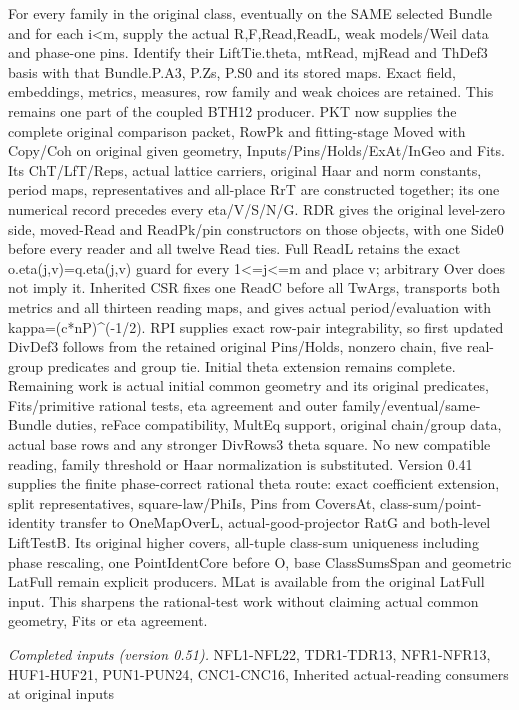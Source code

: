 For every family in the original class, eventually on the SAME selected Bundle and for each i<m, supply the actual R,F,Read,ReadL, weak models/Weil data and phase-one pins. Identify their LiftTie.theta, mtRead, mjRead and ThDef3 basis with that Bundle.P.A3, P.Zs, P.S0 and its stored maps. Exact field, embeddings, metrics, measures, row family and weak choices are retained. This remains one part of the coupled BTH12 producer. PKT now supplies the complete original comparison packet, RowPk and fitting-stage Moved with Copy/Coh on original given geometry, Inputs/Pins/Holds/ExAt/InGeo and Fits. Its ChT/LfT/Reps, actual lattice carriers, original Haar and norm constants, period maps, representatives and all-place RrT are constructed together; its one numerical record precedes every eta/V/S/N/G. RDR gives the original level-zero side, moved-Read and ReadPk/pin constructors on those objects, with one Side0 before every reader and all twelve Read ties. Full ReadL retains the exact o.eta(j,v)=q.eta(j,v) guard for every 1<=j<=m and place v; arbitrary Over does not imply it. Inherited CSR fixes one ReadC before all TwArgs, transports both metrics and all thirteen reading maps, and gives actual period/evaluation with kappa=(c*nP)\textasciicircum{}(-1/2). RPI supplies exact row-pair integrability, so first updated DivDef3 follows from the retained original Pins/Holds, nonzero chain, five real-group predicates and group tie. Initial theta extension remains complete. Remaining work is actual initial common geometry and its original predicates, Fits/primitive rational tests, eta agreement and outer family/eventual/same-Bundle duties, reFace compatibility, MultEq support, original chain/group data, actual base rows and any stronger DivRows3 theta square. No new compatible reading, family threshold or Haar normalization is substituted. Version 0.41 supplies the finite phase-correct rational theta route: exact coefficient extension, split representatives, square-law/PhiIs, Pins from CoversAt, class-sum/point-identity transfer to OneMapOverL, actual-good-projector RatG and both-level LiftTestB. Its original higher covers, all-tuple class-sum uniqueness including phase rescaling, one PointIdentCore before O, base ClassSumsSpan and geometric LatFull remain explicit producers. MLat is available from the original LatFull input. This sharpens the rational-test work without claiming actual common geometry, Fits or eta agreement.

\emph{Completed inputs (version 0.51).} NFL1-NFL22, TDR1-TDR13, NFR1-NFR13, HUF1-HUF21, PUN1-PUN24, CNC1-CNC16, Inherited actual-reading consumers at original inputs

